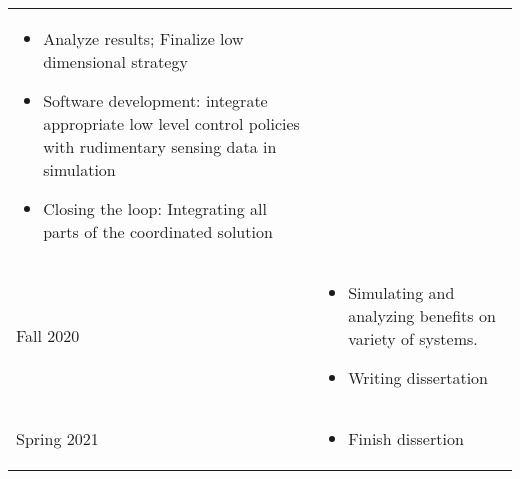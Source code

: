 \documentclass[12pt]{article}
\begin{document}
\begin{center}
\begin{tabular}{ | p{3cm} | p{11cm} |}
\begin{itemize}
    	\item Analyze results; Finalize low dimensional strategy
    	\item Software development: integrate appropriate low level control policies with rudimentary sensing data in simulation
    	\item Closing the loop: Integrating all parts of the coordinated solution
	\end{itemize}\\
	    Fall 2020 & 
    \begin{itemize}
    	\item Simulating and analyzing benefits on variety of systems. 
    	\item Writing dissertation
	\end{itemize}\\
	    Spring 2021 & 
    \begin{itemize}
    	\item Finish dissertion
	\end{itemize}\\

    \hline
    \end{tabular}
\end{center}
\end{document}
